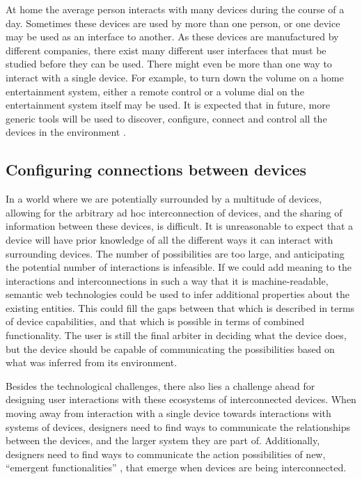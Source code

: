 At home the average person interacts with many devices during the course of a day. Sometimes these devices are used by more than one person, or one device may be used as an interface to another. As these devices are manufactured by different companies, there exist many different user interfaces that must be studied before they can be used. There might even be more than one way to interact with a single device. For example, to turn down the volume on a home entertainment system, either a remote control or a volume dial on the entertainment system itself may be used. It is expected that in future, more generic tools will be used to discover, configure, connect and control all the devices in the environment \cite{Newman2002}. 

\subsection{Configuring connections between devices}

In a world where we are potentially surrounded by a multitude of devices, allowing for the arbitrary ad hoc interconnection of devices, and the sharing of information between these devices, is difficult. It is unreasonable to expect that a device will have prior knowledge of all the different ways it can interact with surrounding devices. The number of possibilities are too large, and anticipating the potential number of interactions is infeasible. If we could add meaning to the interactions and interconnections in such a way that it is machine-readable, semantic web technologies could be used to infer additional properties about the existing entities. This could fill the gaps between that which is described in terms of device capabilities, and that which is possible in terms of combined functionality. The user is still the final arbiter in deciding what the device does, but the device should be capable of communicating the possibilities based on what was inferred from its environment. 

Besides the technological challenges, there also lies a challenge ahead for designing user interactions with these ecosystems of interconnected devices. When moving away from interaction with a single device towards interactions with systems of devices, designers need to find ways to communicate the relationships between the devices, and the larger system they are part of. Additionally, designers need to find ways to communicate the action possibilities of new, ``emergent functionalities'' \cite{Frens2009}, that emerge when devices are being interconnected. 


